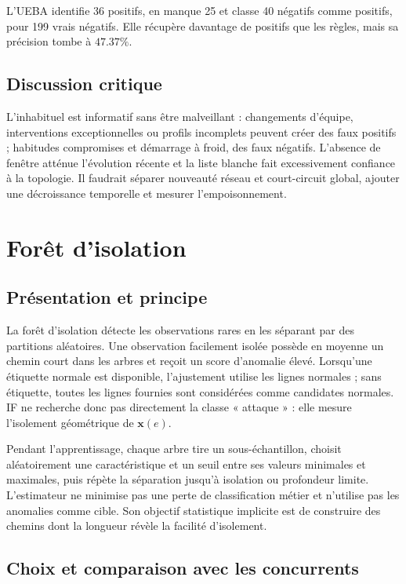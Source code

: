\documentclass[11pt,a4paper,oneside]{report}
\theoremstyle{definition}
\theoremstyle{plain}
\begin{document}
L'UEBA identifie 36 positifs, en manque 25 et classe 40 négatifs comme positifs, pour 199 vrais négatifs. Elle récupère davantage de positifs que les règles, mais sa précision tombe à $47.37\%$.

\subsection*{Discussion critique}

L'inhabituel est informatif sans être malveillant : changements d'équipe, interventions exceptionnelles ou profils incomplets peuvent créer des faux positifs ; habitudes compromises et démarrage à froid, des faux négatifs. L'absence de fenêtre atténue l'évolution récente et la liste blanche fait excessivement confiance à la topologie. Il faudrait séparer nouveauté réseau et court-circuit global, ajouter une décroissance temporelle et mesurer l'empoisonnement.

\section{Forêt d'isolation}
\label{sec:ai-ro-if}

\subsection*{Présentation et principe}

La forêt d'isolation détecte les observations rares en les séparant par des partitions aléatoires. Une observation facilement isolée possède en moyenne un chemin court dans les arbres et reçoit un score d'anomalie élevé. Lorsqu'une étiquette normale est disponible, l'ajustement utilise les lignes normales ; sans étiquette, toutes les lignes fournies sont considérées comme candidates normales. IF ne recherche donc pas directement la classe « attaque » : elle mesure l'isolement géométrique de $\mathbf{x}(e)$.

Pendant l'apprentissage, chaque arbre tire un sous-échantillon, choisit
aléatoirement une caractéristique et un seuil entre ses valeurs minimales et
maximales, puis répète la séparation jusqu'à isolation ou profondeur limite.
L'estimateur ne minimise pas une perte de classification métier et n'utilise
pas les anomalies comme cible. Son objectif statistique implicite est de
construire des chemins dont la longueur révèle la facilité d'isolement.

\subsection*{Choix et comparaison avec les concurrents}
\end{document}
